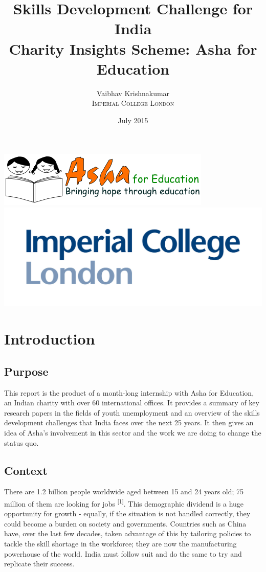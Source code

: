\documentclass[a4paper, 10pt]{article}
\title{Skills Development Challenge for India \\ Charity Insights Scheme: Asha for Education}
\author{Vaibhav Krishnakumar \\ \textsc{Imperial College London}}
\date{July 2015}
\begin{document}
\maketitle 

\vspace{50pt}
\includegraphics[scale=0.9]{asha_logo.png}
\vspace{30pt}
\includegraphics[scale=0.8]{imperial_logo.jpg}

\newpage
{}

\section*{Introduction}
\subsection*{Purpose}
This report is the product of a month-long internship with Asha for Education, an Indian charity with over 60 international offices. It provides a summary of key research papers in the fields of youth unemployment and an overview of the skills development challenges that India faces over the next 25 years. It then gives an idea of Asha's involvement in this sector and the work we are doing to change the status quo.

\subsection*{Context}

\noindent There are 1.2 billion people worldwide aged between 15 and 24 years old; 75 million of them are looking for jobs \textsuperscript{[1]}. This demographic dividend is a huge opportunity for growth - equally, if the situation is not handled correctly, they could become a burden on society and governments. Countries such as China have, over the last few decades, taken advantage of this by tailoring policies to tackle the skill shortage in the workforce; they are now the manufacturing powerhouse of the world. India must follow suit and do the same to try and replicate their success. \\
\end{document}
